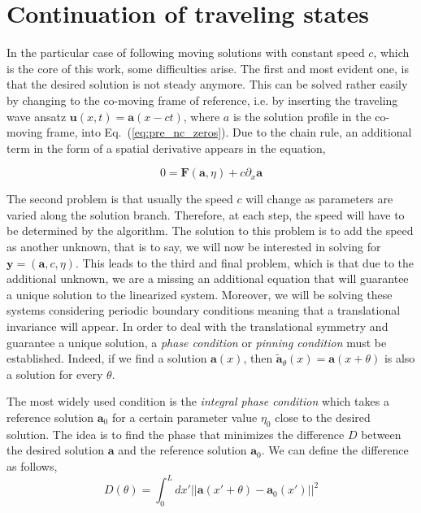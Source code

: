 \section{Continuation of traveling states}

\label{sec:cont_traveling}

In the particular case of following moving solutions with constant speed $c$, which is
the core of this work, some difficulties arise. The first and most evident one, is that
the desired solution is not steady anymore. This can be solved rather easily by
changing to the co-moving frame of reference, i.e. by inserting the traveling wave
ansatz $\bm{u}(x, t) = \bm{a}(x - ct)$, where $a$ is the solution profile in the co-moving frame,
 into Eq.~(\ref{eq:pre_nc_zeros}). Due to the chain rule,
an additional term in the form of a spatial derivative appears in the equation,

\begin{equation}
    0 = \bm{F}(\bm{a}, \eta) + c\partial_x\bm{a}
\end{equation}

The second problem is that usually the speed $c$ will change as parameters
are varied along the solution branch. Therefore, at
each step, the speed will have to be determined by the 
algorithm. The solution to this problem is to add the speed
as another unknown, that is to say, we will now be interested in solving for 
$\bm{y} = (\bm{a}, c, \eta)$. This leads to the third and final problem, which is that due
to the additional unknown, we are a missing an additional equation that will guarantee
a unique solution to the linearized system. Moreover, we will be solving these systems considering periodic
boundary conditions meaning that a translational invariance will appear. In order to
deal with the translational symmetry and guarantee a unique solution, a {\em phase condition}
or {\em pinning condition} must be established. Indeed, if we find a solution
$\bm{a}(x)$, then $\tilde{\bm{a}}_{\theta}(x) = \bm{a}(x  + \theta)$ is also
a solution for every $\theta$. 

The most widely used condition is the
{\em integral phase condition} \cite{doedel1981auto} which takes a reference solution $\bm{a}_0$ for a certain
parameter value $\eta_0$ close to the desired solution. The idea is to find the phase
that minimizes the difference $D$ between the desired solution $\bm{a}$ and the reference solution
$\bm{a}_0$. We can define the difference as follows,
\begin{equation}
    D(\theta) = \int_0^L dx' 
        \left|\left| \bm{a}(x' + \theta) - \bm{a}_0(x') \right|\right|^2    
\end{equation}


